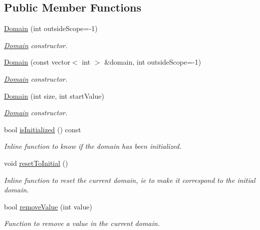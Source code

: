 \subsection*{Public Member Functions}
\begin{DoxyCompactItemize}
\item 
\hyperlink{classghost_1_1Domain_a48bfae90d7dbb6d8e1a3afdd8e471e4f}{Domain} (int outside\-Scope=-\/1)
\begin{DoxyCompactList}\small\item\em \hyperlink{classghost_1_1Domain}{Domain} constructor. \end{DoxyCompactList}\item 
\hyperlink{classghost_1_1Domain_a5277f6bd2940a87b4784834e93cb53c9}{Domain} (const vector$<$ int $>$ \&domain, int outside\-Scope=-\/1)
\begin{DoxyCompactList}\small\item\em \hyperlink{classghost_1_1Domain}{Domain} constructor. \end{DoxyCompactList}\item 
\hyperlink{classghost_1_1Domain_a6a9f7b0aec78acb0b0f4edefaea7a6e9}{Domain} (int size, int start\-Value)
\begin{DoxyCompactList}\small\item\em \hyperlink{classghost_1_1Domain}{Domain} constructor. \end{DoxyCompactList}\item 
bool \hyperlink{classghost_1_1Domain_a1ead2b1ccee560dac9ddb68c15362511}{is\-Initialized} () const 
\begin{DoxyCompactList}\small\item\em Inline function to know if the domain has been initialized. \end{DoxyCompactList}\item 
void \hyperlink{classghost_1_1Domain_a434b4c4fd270ee9be6853b330af9bad4}{reset\-To\-Initial} ()
\begin{DoxyCompactList}\small\item\em Inline function to reset the current domain, ie to make it correspond to the initial domain. \end{DoxyCompactList}\item 
bool \hyperlink{classghost_1_1Domain_a78a9ea39322c0a5984d62331c3c18756}{remove\-Value} (int value)
\begin{DoxyCompactList}\small\item\em Function to remove a value in the current domain. \end{DoxyCompactList}\item 

\end{DoxyCompactItemize}
